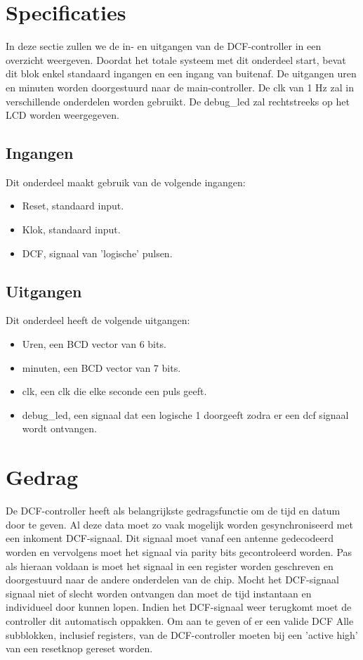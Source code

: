 \section{Specificaties}
In deze sectie zullen we de in- en uitgangen van de DCF-controller in een overzicht weergeven. Doordat het totale systeem met dit onderdeel start, bevat dit blok enkel standaard ingangen en een ingang van buitenaf. De uitgangen uren en minuten worden doorgestuurd naar de main-controller. De clk van 1 Hz zal in verschillende onderdelen worden gebruikt. De debug\_led zal rechtstreeks op het LCD worden weergegeven. 
\subsection{Ingangen}
Dit onderdeel maakt gebruik van de volgende ingangen: 

\begin{itemize}[nolistsep]
\item Reset, standaard input.
\item Klok, standaard input.
\item DCF, signaal van 'logische' pulsen.
\end{itemize}
\noindent

\subsection{Uitgangen}
Dit onderdeel heeft de volgende uitgangen:
\begin{itemize}[nolistsep]
\item Uren, een BCD vector van 6 bits.
\item minuten, een BCD vector van 7 bits.
\item clk, een clk die elke seconde een puls geeft.
\item debug\_led, een signaal dat een logische 1 doorgeeft zodra er een dcf signaal wordt ontvangen.
\end{itemize}


\section{Gedrag}
De DCF-controller heeft als belangrijkste gedragsfunctie om de tijd en datum door te geven. Al deze data moet zo vaak mogelijk worden gesynchroniseerd met een inkoment DCF-signaal. Dit signaal moet vanaf een antenne gedecodeerd worden en vervolgens moet het signaal via parity bits gecontroleerd worden. Pas als hieraan voldaan is moet het signaal in een register worden geschreven en doorgestuurd naar de andere onderdelen van de chip. Mocht het DCF-signaal signaal niet of slecht worden ontvangen dan moet de tijd instantaan en individueel door kunnen lopen. Indien het DCF-signaal weer terugkomt moet de controller dit automatisch oppakken. Om aan te geven of er een valide DCF
Alle subblokken, inclusief registers, van de DCF-controller moeten bij een 'active high' van een resetknop gereset worden.